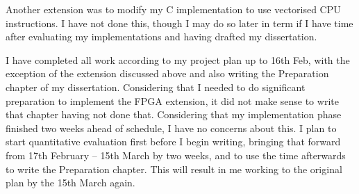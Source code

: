 \documentclass[a4paper,12pt]{article}
\begin{document}
Another extension was to modify my C implementation to use vectorised CPU instructions.
I have not done this, though I may do so later in term if I have time after evaluating my implementations and having drafted my dissertation.

I have completed all work according to my project plan up to 16th Feb, with the exception of the extension discussed above and also writing the Preparation chapter of my dissertation.
Considering that I needed to do significant preparation to implement the FPGA extension, it did not make sense to write that chapter having not done that.
Considering that my implementation phase finished two weeks ahead of schedule, I have no concerns about this.
I plan to start quantitative evaluation first before I begin writing, bringing that forward from 17th February -- 15th March by two weeks, and to use the time afterwards to write the Preparation chapter. This will result in me working to the original plan by the 15th March again.
\end{document}
